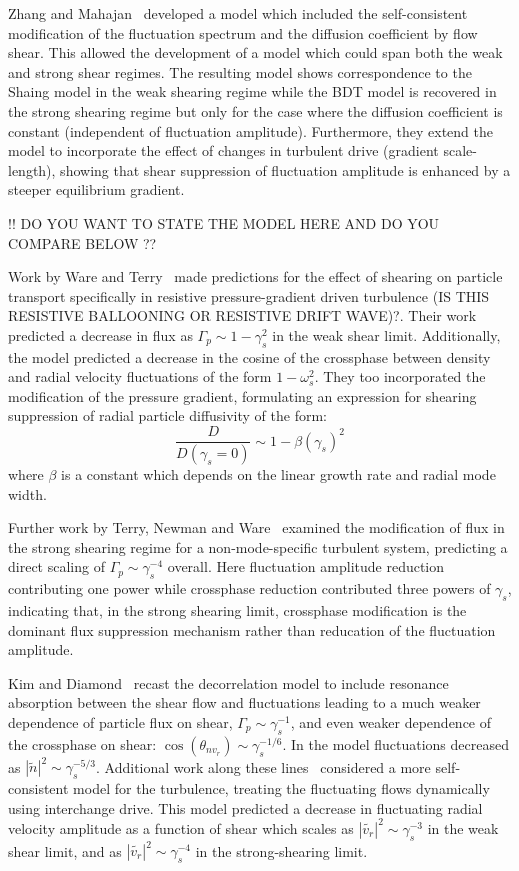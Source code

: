\documentclass[aip,pop,amsmath,amssymb,reprint,superscriptaddress]{revtex4-1} %
\begin{document}
Zhang and Mahajan~\cite{zhang92,zhang93} developed a model which included the self-consistent modification of the fluctuation spectrum and the diffusion coefficient by flow shear.  This allowed the development of a model which could span both the weak and strong shear regimes.   The resulting model shows correspondence to the Shaing model in the weak shearing regime while the BDT model is recovered in the strong shearing regime but only for the case where the diffusion coefficient is constant (independent of fluctuation amplitude). Furthermore, they extend the model to incorporate the effect of changes in turbulent drive (gradient scale-length), showing that shear suppression of fluctuation amplitude is enhanced by a steeper equilibrium gradient. 

!! DO YOU WANT TO STATE THE MODEL HERE AND DO YOU COMPARE BELOW ??

Work by Ware and Terry~\cite{ware96,ware98} made predictions for the effect of shearing on particle transport specifically in resistive pressure-gradient driven turbulence  (IS THIS RESISTIVE BALLOONING OR RESISTIVE DRIFT WAVE)?. Their work predicted a decrease in flux as $\Gamma_{p} \sim 1-\gamma_{s}^2$ in the weak shear limit.  Additionally,  the model predicted a decrease in the cosine of the crossphase between density and radial velocity fluctuations of the form $1-\omega_{s}^2$. They too incorporated the modification of the pressure gradient, formulating an expression for shearing suppression of radial particle diffusivity of the form:
%
\begin{equation}
\frac{D}{D(\gamma_{s}=0)} \sim 1-\beta(\gamma_{s})^2
\label{eq:ware_diff_theory}
\end{equation}
%
where $\beta$ is a constant which depends on the linear growth rate and radial mode width.

Further work by Terry, Newman and Ware~\cite{terry01} examined the modification of flux in the strong shearing regime for a non-mode-specific turbulent system, predicting a direct scaling of $\Gamma_{p} \sim \gamma_{s}^{-4}$ overall.  Here fluctuation amplitude reduction contributing one power while crossphase reduction contributed three powers of $\gamma_s$, indicating that, in the strong shearing limit, crossphase modification is the dominant flux suppression mechanism rather than reducation of the fluctuation amplitude. 

Kim and Diamond~\cite{kim03} recast the decorrelation model to include resonance absorption between the shear flow and fluctuations leading to a much weaker dependence of particle flux on shear, $\Gamma_{p} \sim \gamma_{s}^{-1}$, and even weaker dependence of the crossphase on shear: $\cos(\theta_{nv_{r}}) \sim \gamma_{s}^{-1/6}$.  In the model fluctuations decreased as $|\tilde{n}|^{2} \sim \gamma_{s}^{-5/3}$. Additional work along these lines~\cite{kim04} considered a more self-consistent model for the turbulence, treating the fluctuating flows dynamically using interchange drive.  This model predicted a decrease in fluctuating radial velocity amplitude as a function of shear which scales as $|\tilde{v_{r}}|^{2} \sim \gamma_{s}^{-3}$ in the weak shear limit, and as $|\tilde{v_{r}}|^{2} \sim \gamma_{s}^{-4}$ in the strong-shearing limit.
\end{document}
